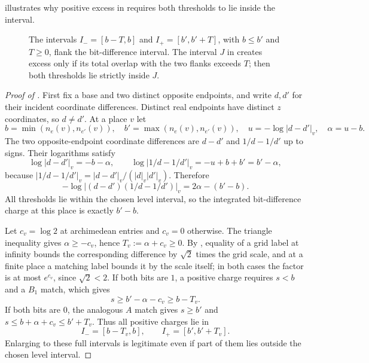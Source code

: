  illustrates why positive excess in
 requires both thresholds to lie inside the interval.

\begin{figure}[htbp]
 \centering
 
 \caption{The intervals $I_-=[b-T,b]$ and $I_+=[b',b'+T]$, with
 $b\le b'$ and $T\ge0$, flank the bit-difference interval.
 The interval $J$ in  creates excess only
 if its total overlap with the two flanks exceeds $T$; then both
 thresholds lie strictly inside $J$.}
 \label{fig:budget-intervals}
\end{figure}

\begin{proof}[Proof of ]
First fix a base and two distinct opposite endpoints, and write
$d,d'$ for their incident coordinate differences.  Distinct real endpoints have
distinct $z$ coordinates, so $d\ne d'$.  At a place $v$ let
\[
 b=\min(n_e(v),n_{e'}(v)),\quad b'=\max(n_e(v),n_{e'}(v)),\quad
 u=-\log|d-d'|_v,\quad \alpha=u-b.
\]
The two opposite-endpoint coordinate differences are $d-d'$ and
$1/d-1/d'$ up to signs. Their logarithms satisfy
\[
 \log|d-d'|_v=-b-\alpha,\qquad
 \log|1/d-1/d'|_v=-u+b+b'=b'-\alpha,
\]
because $|1/d-1/d'|_v=|d-d'|_v/(|d|_v|d'|_v)$. Therefore
\begin{equation}\label{bud:place-identity}
 -\log|(d-d')(1/d-1/d')|_v=2\alpha-(b'-b).
\end{equation}
All thresholds lie within the chosen level interval, so the
integrated bit-difference charge at this place is exactly $b'-b$.

Let $c_v=\log2$ at archimedean entries and $c_v=0$ otherwise.
The triangle inequality gives $\alpha\ge-c_v$, hence
$T_v:=\alpha+c_v\ge0$.  By , equality of a grid label
at infinity bounds the corresponding difference by $\sqrt2$ times the grid
scale, and at a finite place a matching label bounds it by the scale
itself; in both cases the factor is at most $e^{c_v}$, since $\sqrt2<2$.
If both bits are $1$, a positive charge requires $s<b$ and a
$B_1$ match, which gives
\[
 s\ge b'-\alpha-c_v\ge b-T_v.
\]
If both bits are $0$, the analogous $A$ match gives
$s\ge b'$ and $s\le b+\alpha+c_v\le b'+T_v$.
Thus all positive charges lie in
\begin{equation}\label{bud:positive-intervals}
 I_-=[b-T_v,b],\qquad I_+=[b',b'+T_v].
\end{equation}
Enlarging to these full intervals is legitimate even if part of
them lies outside the chosen level interval.


\end{proof}
